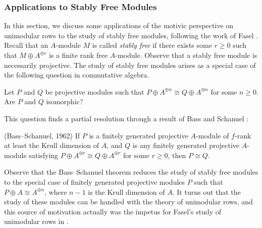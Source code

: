 \subsubsection{Applications to Stably Free Modules} In this section, we discuss some applications of the motivic perspective on unimodular rows to the study of stably free modules, following the work of Fasel \cite[Section 5.2]{Fasel-unim}. Recall that an $A$-module $M$ is called \textit{stably free} if there exists some $r \geq 0$ such that $M \oplus A^{\oplus r}$ is a finite rank free $A$-module. Observe that a stably free module is necessarily projective. The study of stably free modules arises as a special case of the following question in commutative algebra.

\begin{question}
    Let $P$ and $Q$ be projective modules such that $P \oplus A^{\oplus n} \cong Q \oplus A^{\oplus n}$ for some $n \geq 0$. Are $P$ and $Q$ isomorphic?
\end{question}

This question finds a partial resolution through a result of Bass and Schanuel \cite[Theorem 2]{BassSchanuel}:

\begin{theorem}(Bass--Schanuel, 1962)
    If $P$ is a finitely generated projective $A$-module of $f$-rank at least the Krull dimension of $A$, and $Q$ is any finitely generated projective $A$-module satisfying $P \oplus A^{\oplus r} \cong Q \oplus A^{\oplus r}$ for some $r \geq 0$, then $P \cong Q$.
\end{theorem}

Observe that the Bass--Schanuel theorem reduces the study of stably free modules to the special case of finitely generated projective modules $P$ such that $P \oplus A \cong A^{\oplus n}$, where $n-1$ is the Krull dimension of $A$. It turns out that the study of these modules can be handled with the theory of unimodular rows, and this source of motivation actually was the impetus for Fasel's study of unimodular rows in \cite{Fasel-unim}. 

